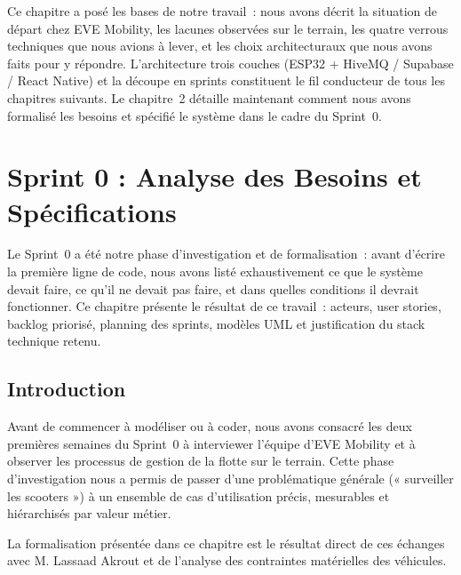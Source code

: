 \documentclass[12pt, a4paper]{report}
\begin{document}
\begin{chapterconclusion}
Ce chapitre a posé les bases de notre travail~: nous avons décrit la situation de
départ chez EVE Mobility, les lacunes observées sur le terrain, les quatre verrous
techniques que nous avions à lever, et les choix architecturaux que nous avons faits
pour y répondre. L'architecture trois couches (ESP32 + HiveMQ / Supabase / React
Native) et la découpe en sprints constituent le fil conducteur de tous les chapitres
suivants. Le chapitre~2 détaille maintenant comment nous avons formalisé les besoins
et spécifié le système dans le cadre du Sprint~0.
\end{chapterconclusion}

\chapter{Sprint 0 : Analyse des Besoins et Spécifications}

\begin{chapterintro}
Le Sprint~0 a été notre phase d'investigation et de formalisation~: avant d'écrire
la première ligne de code, nous avons listé exhaustivement ce que le système devait
faire, ce qu'il ne devait pas faire, et dans quelles conditions il devrait fonctionner.
Ce chapitre présente le résultat de ce travail~: acteurs, user stories, backlog
priorisé, planning des sprints, modèles UML et justification du stack technique retenu.
\end{chapterintro}

\section{Introduction}

Avant de commencer à modéliser ou à coder, nous avons consacré les deux premières
semaines du Sprint~0 à interviewer l'équipe d'EVE Mobility et à observer les processus
de gestion de la flotte sur le terrain. Cette phase d'investigation nous a permis de
passer d'une problématique générale (« surveiller les scooters ») à un ensemble de
cas d'utilisation précis, mesurables et hiérarchisés par valeur métier.

La formalisation présentée dans ce chapitre est le résultat direct de ces échanges
avec M. Lassaad Akrout et de l'analyse des contraintes matérielles des véhicules.
\end{document}
